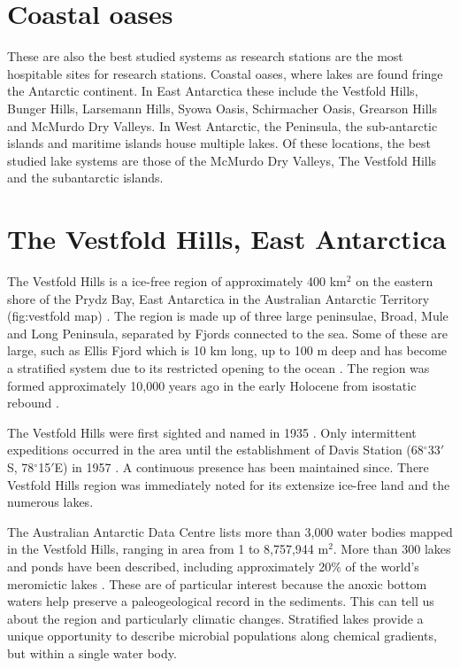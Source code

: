 \section{Coastal oases}
These are also the best studied systems as research stations are the most hospitable sites for research stations.
Coastal oases, where lakes are found fringe the Antarctic continent.
In East Antarctica these include the Vestfold Hills, Bunger Hills, Larsemann Hills, Syowa Oasis, Schirmacher Oasis, Grearson Hills and McMurdo Dry Valleys.
In West Antarctic, the Peninsula, the sub-antarctic islands and maritime islands house multiple lakes. 
Of these locations, the best studied lake systems are those of the McMurdo Dry Valleys, The Vestfold Hills and the subantarctic islands.


\section{The Vestfold Hills, East Antarctica}
The Vestfold Hills is a ice-free region of approximately 400 km$^2$ on the eastern shore of the Prydz Bay, East Antarctica in the Australian Antarctic Territory (fig:vestfold map) \cite{Gibson1999}.
The region is made up of three large peninsulae, Broad, Mule and Long Peninsula, separated by Fjords connected to the sea.
Some of these are large, such as Ellis Fjord which is 10 km long, up to 100 m deep and has become a stratified system due to its restricted opening to the ocean \cite{Burke1988}.
The region was formed approximately 10,000 years ago in the early Holocene from isostatic rebound \cite{Burton1981}. %

The Vestfold Hills were first sighted and named in 1935 \cite{Law1959}.
Only intermittent expeditions occurred in the area until the establishment of Davis Station (68$^{\circ}$33$'$S, 78$^{\circ}$15$'$E) in 1957 \cite{Law1959}. 
A continuous presence has been maintained since. %
There Vestfold Hills region was immediately noted for its extensize ice-free land and the numerous lakes\cite{Johnstone1973}.

The Australian Antarctic Data Centre lists more than 3,000 water bodies mapped in the Vestfold Hills, ranging in area from 1 to 8,757,944 m$^2$. %
More than 300 lakes and ponds have been described, including approximately 20\% of the world's meromictic lakes \cite{Gibson1999}. %
These are of particular interest because the anoxic bottom waters help preserve a paleogeological record in the sediments.
This can tell us about the region and particularly climatic changes.
Stratified lakes provide a unique opportunity to describe microbial populations along chemical gradients, but within a single water body. 


